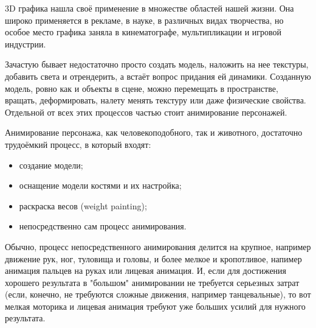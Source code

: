 
3D графика нашла своё применение в множестве областей нашей жизни. Она широко применяется в рекламе, в науке, в различных видах творчества, но особое место графика заняла в кинематографе, мультипликации и игровой индустрии.

Зачастую бывает недостаточно просто создать модель, наложить на нее текстуры, добавить света и отрендерить, а встаёт вопрос придания ей динамики. Созданную модель, ровно как и объекты в сцене, можно перемещать в пространстве, вращать, деформировать, налету менять текстуру или даже физические свойства. Отдельной от всех этих процессов частью стоит анимирование персонажей.

Анимирование персонажа, как человекоподобного, так и животного, достаточно трудоёмкий процесс, в который входят:
\begin{itemize}
	\item создание модели;
	\item оснащение модели костями и их настройка;
	\item раскраска весов (weight painting);
	\item непосредственно сам процесс анимирования.
\end{itemize}

Обычно, процесс непосредственного анимирования делится на крупное, например движение рук, ног, туловища и головы, и более мелкое и кропотливое, напимер анимация пальцев на руках или лицевая анимация. И, если для достижения хорошего результата в "большом" анимировании не требуется серьезных затрат (если, конечно, не требуются сложные движения, например танцевальные), то вот мелкая моторика и лицевая анимация требуют уже больших усилий для нужного результата.




\clearpage
